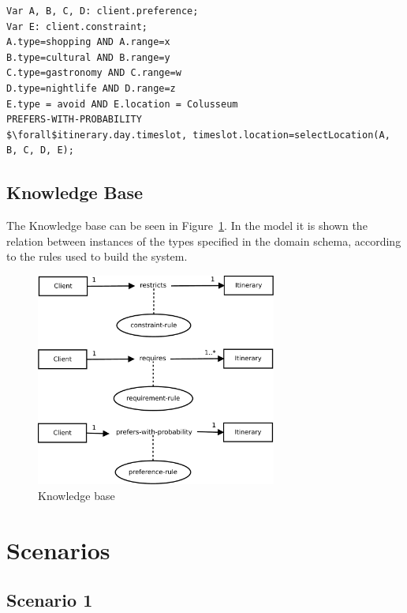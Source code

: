 \documentclass[11pt]{article} %
\begin{document}
\begin{lstlisting}[label=Rules,caption=The client expresses four preferences with four ranges (from 1 to 5). The method selectLocation will compose the itinerary selecting the locations that fits the preferences. For example it could select 3 shopping\, 1 gastronomy and 1 cultural locations.,breaklines=true,mathescape=true]
Var A, B, C, D: client.preference;
Var E: client.constraint;
A.type=shopping AND A.range=x
B.type=cultural AND B.range=y
C.type=gastronomy AND C.range=w
D.type=nightlife AND D.range=z
E.type = avoid AND E.location = Colusseum
PREFERS-WITH-PROBABILITY
$\forall$itinerary.day.timeslot, timeslot.location=selectLocation(A, B, C, D, E);
\end{lstlisting}

\subsection{Knowledge Base}

The Knowledge base can be seen in Figure~\ref{fig:knowledgebase}.
In the model it is shown the relation between instances of the types specified in the domain schema, according to the rules used to build the system.

\begin{figure}[H]
\centering
\includegraphics[height=7cm]{images/knowledge_base.pdf}
\caption{Knowledge base}
\label{fig:knowledgebase}
\end{figure}



\section{Scenarios}

\subsection{Scenario 1}
\end{document}
